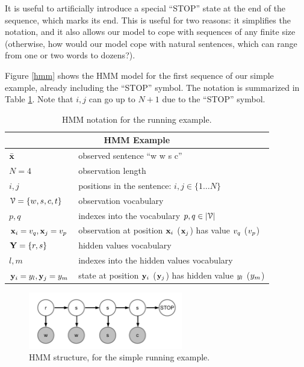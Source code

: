 It is useful to artificially introduce a special ``STOP'' state at the end of the sequence, which marks its end. This is useful for two reasons: it simplifies the notation, and it also allows our model to cope with sequences of any finite size (otherwise, how would our model cope with natural sentences, which can range from one or two words to dozens?).

Figure \ref{hmm} shows the HMM model for the first sequence of our simple
example, already including the ``STOP'' symbol. The notation is summarized in Table \ref{tab:hmm-simple-notation}. Note that $i,j$ can go up to $N+1$ due to the ``STOP'' symbol.


\begin{table}[h]
\begin{center}
\begin{tabular}{|l|l|}
\hline
\multicolumn{2}{|c|}{HMM Example}\\
\hline
\hline
$\bar{\mathbf{x}}$ & observed sentence ``w w s c'' \\
\hline
$N = 4$ & observation length \\
\hline
$i,j$ & positions in the sentence: $i,j \in \{1 \ldots N\}$ \\
\hline
$\mathcal{V} = \{w,s,c,t\}$ & observation vocabulary \\
\hline 
$p,q$ & indexes into the vocabulary $p,q \in |\mathcal{V}|$\\
\hline
$\mathbf{x}_i = {v}_q,\mathbf{x}_j = {v}_p$ & observation at position $\mathbf{x}_i$ ($\mathbf{x}_j$) has value ${v}_q$ (${v}_p$)\\
\hline 
$\mathbf{Y} = \{r,s\}$ & hidden values vocabulary\\
\hline 
$l,m$ & indexes into the hidden values vocabulary\\
\hline
$\mathbf{y}_i = {y}_l,\mathbf{y}_j = {y}_m$ & state at position $\mathbf{y}_i$ ($\mathbf{y}_j$) has hidden value ${y}_l$ (${y}_m$)\\
\hline
\end{tabular}
\end{center}
\caption[HMM notation]{\label{tab:hmm-simple-notation} HMM notation for the running example.}
\end{table}

\begin{figure}[ht]
\centering
\includegraphics[width=0.6\textwidth]{figs/sequences/hmm}
\caption[HMM running example]{\label{fig:hmm} HMM structure, for the simple
running example.}
\end{figure}



